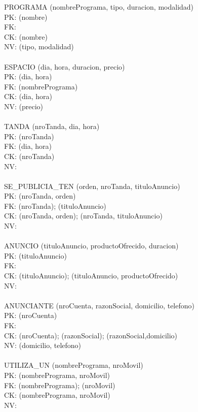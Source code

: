 \documentclass[a4paper,10pt,titlepage]{article}
\begin{document}
PROGRAMA (nombrePrograma, tipo, duracion, modalidad)\\
PK: (nombre)\\
FK:\\
CK: (nombre)\\
NV: (tipo, modalidad)\\
\\
ESPACIO (dia, hora, duracion, precio)\\
PK: (dia, hora)\\
FK: (nombrePrograma)\\
CK: (dia, hora)\\
NV: (precio)\\
\\
TANDA (nroTanda, dia, hora)\\
PK: (nroTanda)\\
FK: (dia, hora)\\
CK: (nroTanda)\\
NV:\\
\\
SE\_PUBLICIA\_TEN (orden, nroTanda, tituloAnuncio)\\
PK: (nroTanda, orden)\\
FK: (nroTanda); (tituloAnuncio)\\
CK: (nroTanda, orden); (nroTanda, tituloAnuncio)\\
NV:\\
\\
ANUNCIO (tituloAnuncio, productoOfrecido, duracion)\\
PK: (tituloAnuncio)\\
FK:\\
CK: (tituloAnuncio); (tituloAnuncio, productoOfrecido)\\
NV: \\
\\
ANUNCIANTE (nroCuenta, razonSocial, domicilio, telefono)\\
PK: (nroCuenta)\\
FK:\\
CK: (nroCuenta); (razonSocial); (razonSocial,domicilio)\\
NV: (domicilio, telefono)\\
\\
UTILIZA\_UN (nombrePrograma, nroMovil)\\
PK: (nombrePrograma, nroMovil)\\
FK: (nombrePrograma); (nroMovil)\\
CK: (nombrePrograma, nroMovil)\\
NV:\\
\end{document}
